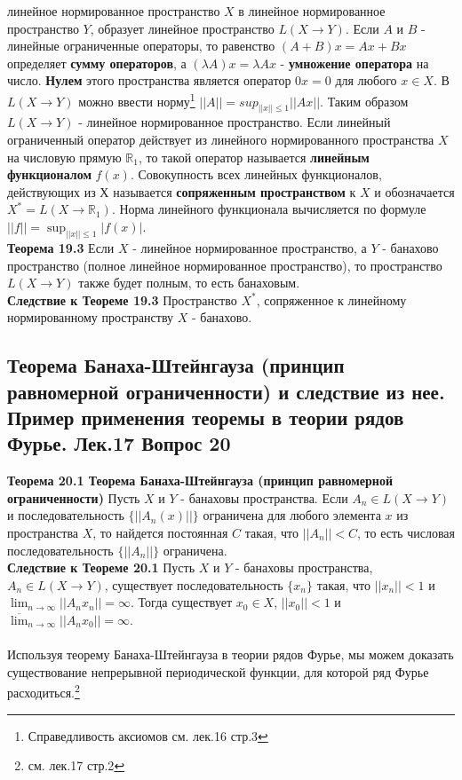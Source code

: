 \documentclass{article}
\begin{document}
	линейное нормированное пространство $X$ в линейное нормированное
	пространство $Y$, образует линейное пространство $L(X\rightarrow Y)$. Если $A$ и $B$ - линейные ограниченные операторы, то равенство $(A+B)x=Ax+Bx$ определяет \textbf{сумму операторов}, а $(\lambda A)x=\lambda Ax$ - \textbf{умножение оператора} на число. \textbf{Нулем} этого пространства является оператор $0x=0$ для любого $x\in X$. В $L(X\rightarrow Y)$ можно ввести норму\footnote{Справедливость аксиомов см. лек.16 стр.3} $||A||=sup_{||x||\le 1} ||Ax||$. Таким образом $L(X\rightarrow Y)$ - линейное нормированное пространство.
	Если линейный ограниченный оператор действует из линейного
	нормированного пространства $X$ на числовую прямую ${\mathbb{R}}_{1}$, то такой оператор называется \textbf{линейным функционалом} $f(x)$. Совокупность всех линейных функционалов, действующих из Х называется \textbf{сопряженным пространством} к $X$ и обозначается ${X}^{*}=L(X\rightarrow {\mathbb{R}}_{1})$. Норма линейного функционала вычисляется по формуле $||f||=\sup_{||x||\le 1} |f(x)|$.\\
	
	\textbf{Теорема 19.3} Если $X$ - линейное нормированное пространство, а $Y$ - банахово пространство (полное линейное нормированное пространство), то пространство $L(X\rightarrow Y)$ также будет полным, то есть банаховым.\\
	\textbf{Следствие к Теореме 19.3} Пространство ${X}^{*}$, сопряженное к линейному нормированному пространству $X$ - банахово.\\
\subsection{Теорема Банаха-Штейнгауза (принцип равномерной ограниченности) и следствие из нее. Пример применения теоремы в теории рядов Фурье. Лек.17 \textbf{Вопрос 20}}
	\textbf{Теорема 20.1 Теорема Банаха-Штейнгауза (принцип равномерной ограниченности)} Пусть $X$ и $Y$ - банаховы пространства. Если ${A}_{n}\in L(X\rightarrow Y)$ и последовательность $\{||{A}_{n}(x)||\}$ ограничена для любого элемента $x$ из пространства $X$, то найдется постоянная $C$ такая, что $||{A}_{n}||<C$, то есть числовая последовательность $\{||{A}_{n}||\}$ ограничена.\\
	\textbf{Следствие к Теореме 20.1} Пусть $X$ и $Y$ - банаховы пространства, ${A}_{n}\in L(X\rightarrow Y)$, существует последовательность $\{{x}_{n}\}$ такая, что $||{x}_{n}||<1$ и $\lim_{n \rightarrow \infty} ||{A}_{n}{x}_{n}||=\infty$. Тогда существует ${x}_{0}\in X$, $||{x}_{0}||<1$ и $\overline{\lim}_{n \rightarrow \infty} ||{A}_{n}{x}_{0}||=\infty$.\\
	\\
	Используя теорему Банаха-Штейнгауза в теории рядов Фурье, мы можем доказать существование непрерывной периодической функции, для которой ряд Фурье расходиться.\footnote{см. лек.17 стр.2}\\
\end{document}
